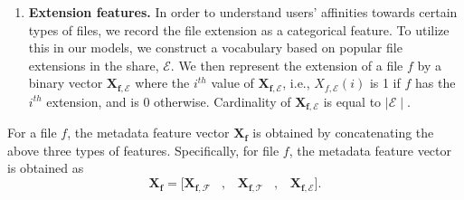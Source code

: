 \begin{enumerate}

\item \textbf{Extension features.}  In order to understand users'
  affinities towards certain types of files, we record the file
  extension as a categorical feature. To utilize this in our models,
  we construct a vocabulary based on popular file extensions in the
  share, $\mathcal{E}$. We then represent the extension of a file $f$
  by a binary vector $\mathbf{X_{f, \mathcal{E}}}$ where the $i^{th}$
  value of $\mathbf{X_{f, \mathcal{E}}}$, i.e., $X_{f,
    \mathcal{E}}(i)$ is 1 if $f$ has the $i^{th}$ extension, and is 0
  otherwise. Cardinality of $\mathbf{X_{f, \mathcal{E}}}$ is equal to
  $\mid \mathcal{E} \mid$.
\end{enumerate}
For a file $f$, the metadata feature vector $\mathbf{X_f}$ is obtained
by concatenating the above three types of features. Specifically, for
file $f$, the metadata feature vector is obtained as
\begin{equation}
\label{eq:featurevector}
\mathbf{X_f} = \lbrack  \mathbf{X_{f,\mathcal{F}}} \; \; \; , \;  \;  \;  \mathbf{X_{f,\mathcal{T}}} \; \; \; , \;  \;  \;  \mathbf{X_{f, \mathcal{E}}}  \rbrack. 
\end{equation}

